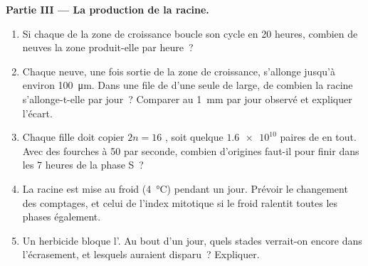 \begin{problem}
\medskip
\noindent\textbf{Partie III --- La production de la racine.}
\begin{enumerate}[resume]
  \item Si chaque  de la zone de croissance boucle son cycle en
        20 heures, combien de  neuves la zone produit-elle par
        heure~?
  \item Chaque  neuve, une fois sortie de la zone de croissance,
        s'allonge jusqu'à environ \qty{100}{\micro m}. Dans une file de
         d'une seule  de large, de combien la racine
        s'allonge-t-elle par jour~? Comparer au \qty{1}{mm} par jour
        observé et expliquer l'écart.
  \item Chaque  fille doit copier $2n = 16$ , soit
        quelque $\num{1.6e10}$ paires de  en tout. Avec des
        fourches à 50  par seconde, combien d'origines
        faut-il pour finir dans les 7 heures de la phase S~?
  \item La racine est mise au froid (\qty{4}{\celsius}) pendant un
        jour. Prévoir le changement des comptages, et celui de l'index
        mitotique si le froid ralentit toutes les phases également.
  \item Un herbicide bloque l'. Au bout d'un jour, quels
        stades verrait-on encore dans l'écrasement, et lesquels
        auraient disparu~? Expliquer.
\end{enumerate}


\end{problem}
